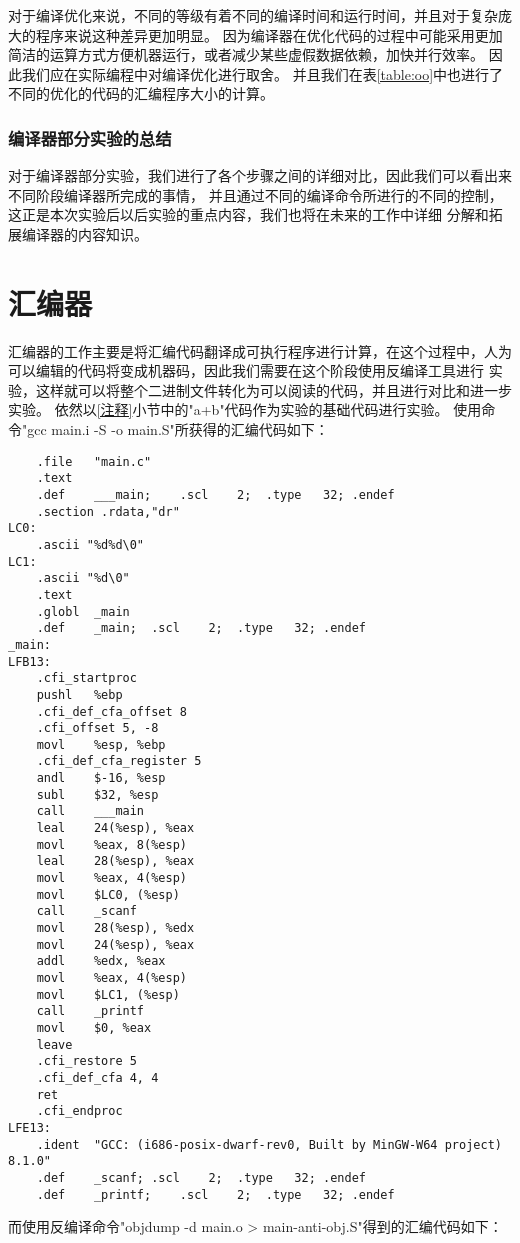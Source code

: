 \documentclass[UTF8]{ctexart}
\begin{document}
对于编译优化来说，不同的等级有着不同的编译时间和运行时间，并且对于复杂庞大的程序来说这种差异更加明显。
因为编译器在优化代码的过程中可能采用更加简洁的运算方式方便机器运行，或者减少某些虚假数据依赖，加快并行效率。
因此我们应在实际编程中对编译优化进行取舍。
并且我们在表{\ref{table:oo}}中也进行了不同的优化的代码的汇编程序大小的计算。

\subsubsection{编译器部分实验的总结}
对于编译器部分实验，我们进行了各个步骤之间的详细对比，因此我们可以看出来不同阶段编译器所完成的事情，
并且通过不同的编译命令所进行的不同的控制，这正是本次实验后以后实验的重点内容，我们也将在未来的工作中详细
分解和拓展编译器的内容知识。
\section{汇编器}
汇编器的工作主要是将汇编代码翻译成可执行程序进行计算，在这个过程中，人为可以编辑的代码将变成机器码，因此我们需要在这个阶段使用反编译工具进行
实验，这样就可以将整个二进制文件转化为可以阅读的代码，并且进行对比和进一步实验。
依然以{\ref{注释}}小节中的"a+b"代码作为实验的基础代码进行实验。
使用命令"gcc main.i -S -o main.S"所获得的汇编代码如下：
\begin{lstlisting}
    .file	"main.c"
	.text
	.def	___main;	.scl	2;	.type	32;	.endef
	.section .rdata,"dr"
LC0:
	.ascii "%d%d\0"
LC1:
	.ascii "%d\0"
	.text
	.globl	_main
	.def	_main;	.scl	2;	.type	32;	.endef
_main:
LFB13:
	.cfi_startproc
	pushl	%ebp
	.cfi_def_cfa_offset 8
	.cfi_offset 5, -8
	movl	%esp, %ebp
	.cfi_def_cfa_register 5
	andl	$-16, %esp
	subl	$32, %esp
	call	___main
	leal	24(%esp), %eax
	movl	%eax, 8(%esp)
	leal	28(%esp), %eax
	movl	%eax, 4(%esp)
	movl	$LC0, (%esp)
	call	_scanf
	movl	28(%esp), %edx
	movl	24(%esp), %eax
	addl	%edx, %eax
	movl	%eax, 4(%esp)
	movl	$LC1, (%esp)
	call	_printf
	movl	$0, %eax
	leave
	.cfi_restore 5
	.cfi_def_cfa 4, 4
	ret
	.cfi_endproc
LFE13:
	.ident	"GCC: (i686-posix-dwarf-rev0, Built by MinGW-W64 project) 8.1.0"
	.def	_scanf;	.scl	2;	.type	32;	.endef
	.def	_printf;	.scl	2;	.type	32;	.endef
\end{lstlisting}
而使用反编译命令"objdump -d main.o > main-anti-obj.S"得到的汇编代码如下：
\end{document}
